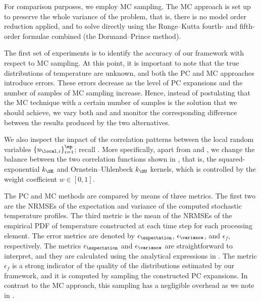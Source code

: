 For comparison purposes, we employ \ac{MC} sampling. The \ac{MC} approach is set
up to preserve the whole variance of the problem, that is, there is no model
order reduction applied, and to solve  directly
using the Runge--Kutta fourth- and fifth-order formulae combined (the
Dormand--Prince method).


The first set of experiments is to identify the accuracy of our framework with
respect to \ac{MC} sampling. At this point, it is important to note that the
true distributions of temperature are unknown, and both the \ac{PC} and \ac{MC}
approaches introduce errors. These errors decrease as the level \lc of \ac{PC}
expansions and the number of samples \no of \ac{MC} sampling increase. Hence,
instead of postulating that the \ac{MC} technique with a certain number of
samples is the solution that we should achieve, we vary both \lc and \no and
monitor the corresponding difference between the results produced by the two
alternatives.

We also inspect the impact of the correlation patterns between the local random
variables $\{ u_{\local, i} \}_{i = 1}^\np$; recall
. More specifically, apart from \lc and \no,
we change the balance between the two correlation functions shown in
, that is, the squared-exponential $k_\SE$ and
Ornstein--Uhlenbeck $k_\OU$ kernels, which is controlled by the weight
coefficient $w \in [0, 1]$.

The \ac{PC} and \ac{MC} methods are compared by means of three metrics. The
first two are the \acfp{NRMSE} of the expectation and variance of the computed
stochastic temperature profiles. The third metric is the mean of the \acp{NRMSE}
of the empirical \acf{PDF} of temperature constructed at each time step for each
processing element. The error metrics are denoted by $\epsilon_{\expectation}$,
$\epsilon_{\variance}$, and $\epsilon_f$, respectively. The metrics
$\epsilon_{\expectation}$ and $\epsilon_{\variance}$ are straightforward to
interpret, and they are calculated using the analytical expressions in
. The metric $\epsilon_f$ is a strong indicator of the
quality of the distributions estimated by our framework, and it is computed by
sampling the constructed \ac{PC} expansions. In contrast to the \ac{MC}
approach, this sampling has a negligible overhead as we note in
.

